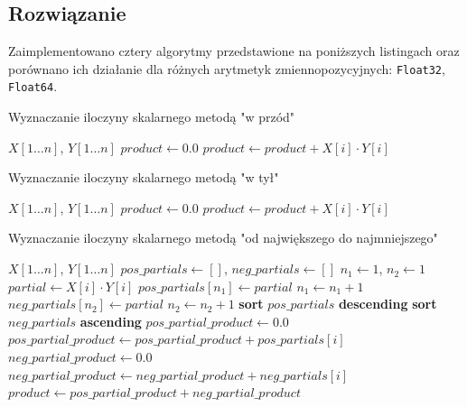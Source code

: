 \documentclass{article}
\begin{document}
\subsection{Rozwiązanie}
Zaimplementowano cztery algorytmy przedstawione na poniższych listingach oraz porównano ich działanie dla różnych arytmetyk zmiennopozycyjnych: \texttt{Float32}, \texttt{Float64}.

\begin{algorithm}
    \caption{Wyznaczanie iloczyny skalarnego metodą "w przód"}
    \begin{algorithmic}
        \Require $X[1 \dots n]$, $Y[1 \dots n]$
        \State $product \gets 0.0$
            \State $product \gets product + X[i] \cdot Y[i]$
        \EndFor
    \end{algorithmic}
\end{algorithm}

\begin{algorithm}
    \caption{Wyznaczanie iloczyny skalarnego metodą "w tył"}
    \begin{algorithmic}
        \Require $X[1 \dots n]$, $Y[1 \dots n]$
        \State $product \gets 0.0$
            \State $product \gets product + X[i] \cdot Y[i]$
        \EndFor
    \end{algorithmic}
\end{algorithm}

\begin{algorithm}
    \caption{Wyznaczanie iloczyny skalarnego metodą "od największego do najmniejszego"}
    \begin{algorithmic}
        \Require $X[1 \dots n]$, $Y[1 \dots n]$
        \State $pos\_partials \gets []$, $neg\_partials \gets []$
        \State $n_1 \gets 1$, $n_2 \gets 1$
            \State $partial \gets X[i] \cdot Y[i]$
                \State $pos\_partials[n_1] \gets partial$
                \State $n_1 \gets n_1 + 1$
            \Else
                \State $neg\_partials[n_2] \gets partial$
                \State $n_2 \gets n_2 + 1$
            \EndIf
        \EndFor
        \State
        \State \textbf{sort} $pos\_partials$ \textbf{descending}
        \State \textbf{sort} $neg\_partials$ \textbf{ascending}
        \State
        \State $pos\_partial\_product \gets 0.0$
            \State $pos\_partial\_product \gets pos\_partial\_product + pos\_partials[i]$
        \EndFor
        \State $neg\_partial\_product \gets 0.0$
            \State $neg\_partial\_product \gets neg\_partial\_product + neg\_partials[i]$
        \EndFor
        \State $product \gets pos\_partial\_product + neg\_partial\_product$
    \end{algorithmic}
\end{algorithm}
\end{document}
